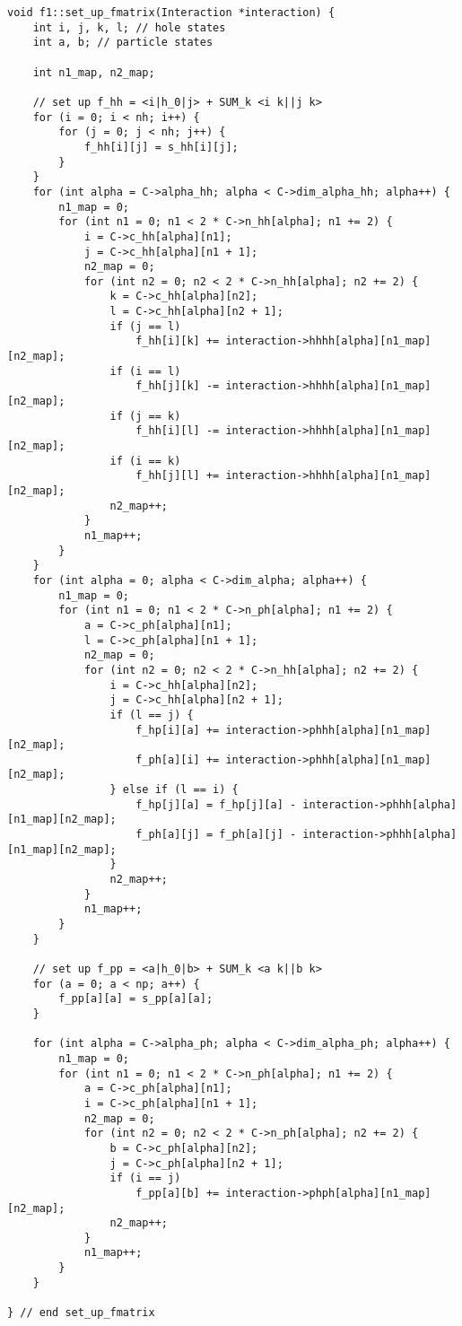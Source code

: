 \begin{lstlisting}[label={list:impl:fmatrixcalc},caption={code-snippet illustrating the implementation of the Fmatrix calculation. See the text for description.}]
void f1::set_up_fmatrix(Interaction *interaction) {
    int i, j, k, l; // hole states
    int a, b; // particle states
    
    int n1_map, n2_map;
    
    // set up f_hh = <i|h_0|j> + SUM_k <i k||j k>
    for (i = 0; i < nh; i++) {
        for (j = 0; j < nh; j++) {
            f_hh[i][j] = s_hh[i][j];
        }
    }
    for (int alpha = C->alpha_hh; alpha < C->dim_alpha_hh; alpha++) {
        n1_map = 0;
        for (int n1 = 0; n1 < 2 * C->n_hh[alpha]; n1 += 2) {
            i = C->c_hh[alpha][n1];
            j = C->c_hh[alpha][n1 + 1];
            n2_map = 0;
            for (int n2 = 0; n2 < 2 * C->n_hh[alpha]; n2 += 2) {
                k = C->c_hh[alpha][n2];
                l = C->c_hh[alpha][n2 + 1];
                if (j == l)
                    f_hh[i][k] += interaction->hhhh[alpha][n1_map][n2_map];
                if (i == l)
                    f_hh[j][k] -= interaction->hhhh[alpha][n1_map][n2_map];
                if (j == k)
                    f_hh[i][l] -= interaction->hhhh[alpha][n1_map][n2_map];
                if (i == k)
                    f_hh[j][l] += interaction->hhhh[alpha][n1_map][n2_map];
                n2_map++;
            }
            n1_map++;
        }
    }
    for (int alpha = 0; alpha < C->dim_alpha; alpha++) {
        n1_map = 0;
        for (int n1 = 0; n1 < 2 * C->n_ph[alpha]; n1 += 2) {
            a = C->c_ph[alpha][n1];
            l = C->c_ph[alpha][n1 + 1];
            n2_map = 0;
            for (int n2 = 0; n2 < 2 * C->n_hh[alpha]; n2 += 2) {
                i = C->c_hh[alpha][n2];
                j = C->c_hh[alpha][n2 + 1];
                if (l == j) {
                    f_hp[i][a] += interaction->phhh[alpha][n1_map][n2_map];
                    f_ph[a][i] += interaction->phhh[alpha][n1_map][n2_map];
                } else if (l == i) {
                    f_hp[j][a] = f_hp[j][a] - interaction->phhh[alpha][n1_map][n2_map];
                    f_ph[a][j] = f_ph[a][j] - interaction->phhh[alpha][n1_map][n2_map];
                }
                n2_map++;
            }
            n1_map++;
        }
    }
    
    // set up f_pp = <a|h_0|b> + SUM_k <a k||b k>
    for (a = 0; a < np; a++) {
        f_pp[a][a] = s_pp[a][a];
    }

    for (int alpha = C->alpha_ph; alpha < C->dim_alpha_ph; alpha++) {
        n1_map = 0;
        for (int n1 = 0; n1 < 2 * C->n_ph[alpha]; n1 += 2) {
            a = C->c_ph[alpha][n1];
            i = C->c_ph[alpha][n1 + 1];
            n2_map = 0;
            for (int n2 = 0; n2 < 2 * C->n_ph[alpha]; n2 += 2) {
                b = C->c_ph[alpha][n2];
                j = C->c_ph[alpha][n2 + 1];
                if (i == j)
                    f_pp[a][b] += interaction->phph[alpha][n1_map][n2_map];
                n2_map++;
            }
            n1_map++;
        }
    }

} // end set_up_fmatrix
\end{lstlisting}
